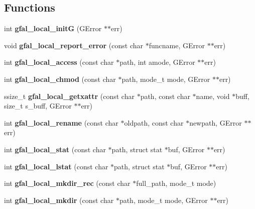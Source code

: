 \subsection*{Functions}
\begin{CompactItemize}
\item 
int \textbf{gfal\_\-local\_\-init\-G} (GError $\ast$$\ast$err)\label{gfal__posix__local__file_8c_3018fb6ca27f7e5da4056bcfc5b76713}

\item 
void \textbf{gfal\_\-local\_\-report\_\-error} (const char $\ast$funcname, GError $\ast$$\ast$err)\label{gfal__posix__local__file_8c_2de9f8c077a2d44c1f4c1656ac5a20fc}

\item 
int \textbf{gfal\_\-local\_\-access} (const char $\ast$path, int amode, GError $\ast$$\ast$err)\label{gfal__posix__local__file_8c_a98ca73fb3083a78f5d85b1f298a8b97}

\item 
int \textbf{gfal\_\-local\_\-chmod} (const char $\ast$path, mode\_\-t mode, GError $\ast$$\ast$err)\label{gfal__posix__local__file_8c_d6c6d5590083bbcef4833f8186a629f3}

\item 
ssize\_\-t \textbf{gfal\_\-local\_\-getxattr} (const char $\ast$path, const char $\ast$name, void $\ast$buff, size\_\-t s\_\-buff, GError $\ast$$\ast$err)\label{gfal__posix__local__file_8c_6f5556fe718ce94ebbf6ae370b0ef682}

\item 
int \textbf{gfal\_\-local\_\-rename} (const char $\ast$oldpath, const char $\ast$newpath, GError $\ast$$\ast$err)\label{gfal__posix__local__file_8c_360b4701633deaae52f9f77c94173405}

\item 
int \textbf{gfal\_\-local\_\-stat} (const char $\ast$path, struct stat $\ast$buf, GError $\ast$$\ast$err)\label{gfal__posix__local__file_8c_dc96268400be1d41613ab796237c1cb8}

\item 
int \textbf{gfal\_\-local\_\-lstat} (const char $\ast$path, struct stat $\ast$buf, GError $\ast$$\ast$err)\label{gfal__posix__local__file_8c_5ad87b117d838e861e51a0999307cc71}

\item 
int \textbf{gfal\_\-local\_\-mkdir\_\-rec} (const char $\ast$full\_\-path, mode\_\-t mode)\label{gfal__posix__local__file_8c_4cb0dd1292a24921b9f693a836dc5771}

\item 
int \textbf{gfal\_\-local\_\-mkdir} (const char $\ast$path, mode\_\-t mode, GError $\ast$$\ast$err)\label{gfal__posix__local__file_8c_29c13ce3294eab970124d188fab1c567}


\end{CompactItemize}
